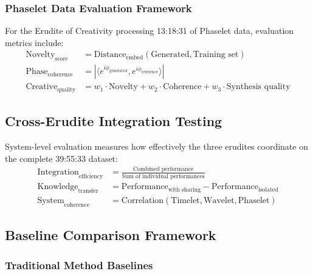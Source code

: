 \subsubsection{Phaselet Data Evaluation Framework}

\begin{definition}
For the Erudite of Creativity processing 13:18:31 of Phaselet data, evaluation metrics include:
\begin{align}
\text{Novelty}_{\text{score}} &= \text{Distance}_{\text{embed}}(\text{Generated}, \text{Training set}) \\
\text{Phase}_{\text{coherence}} &= |\langle e^{i\phi_{\text{generated}}}, e^{i\phi_{\text{reference}}} \rangle| \\
\text{Creative}_{\text{quality}} &= w_1 \cdot \text{Novelty} + w_2 \cdot \text{Coherence} + w_3 \cdot \text{Synthesis quality}
\end{align}
\end{definition}

\subsection{Cross-Erudite Integration Testing}

\begin{definition}
System-level evaluation measures how effectively the three erudites coordinate on the complete 39:55:33 dataset:
\begin{align}
\text{Integration}_{\text{efficiency}} &= \frac{\text{Combined performance}}{\text{Sum of individual performances}} \\
\text{Knowledge}_{\text{transfer}} &= \text{Performance}_{\text{with sharing}} - \text{Performance}_{\text{isolated}} \\
\text{System}_{\text{coherence}} &= \text{Correlation}(\text{Timelet}, \text{Wavelet}, \text{Phaselet})
\end{align}
\end{definition}

\subsection{Baseline Comparison Framework}

\subsubsection{Traditional Method Baselines}


